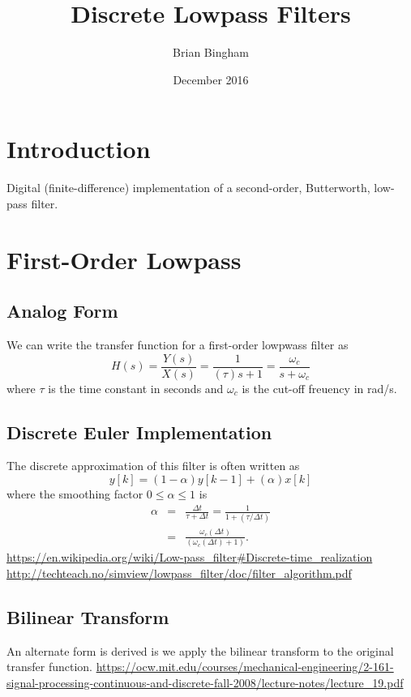 \documentclass[12pt, letterpaper, twoside]{article}
\title{Discrete Lowpass Filters}
\author{Brian Bingham}%
\date{December 2016}
\begin{document}
\maketitle

\section*{Introduction}
Digital (finite-difference) implementation of a second-order, Butterworth, low-pass filter.

\section{First-Order Lowpass}
\subsection{Analog Form}
We can write the transfer function for a first-order lowpwass filter as
\[
H(s) = \frac{Y(s)}{X(s)} = \frac{1}{(\tau)s +1} = \frac{\omega_c}{s+\omega_c}
\]
where $\tau$ is the time constant in seconds and $\omega_c$ is the cut-off freuency in rad/s.
\subsection{Discrete Euler Implementation}
The discrete approximation of this filter is often written as
\[
y[k] = (1-\alpha) y[k-1] + (\alpha) x[k]
\]
where the smoothing factor $0 \leq \alpha \leq 1$ is
\begin{eqnarray*}
\alpha & = & \frac{\Delta t}{\tau + \Delta t} = \frac{1}{1+(\tau / \Delta t)}\\
       & = & \frac{\omega_c (\Delta t)}{(\omega_c (\Delta t)+1)}.
\end{eqnarray*}
\url{https://en.wikipedia.org/wiki/Low-pass_filter#Discrete-time_realization}
\url{http://techteach.no/simview/lowpass_filter/doc/filter_algorithm.pdf}

\subsection{Bilinear Transform}
An alternate form is derived is we apply the bilinear transform to the original transfer function.
\url{https://ocw.mit.edu/courses/mechanical-engineering/2-161-signal-processing-continuous-and-discrete-fall-2008/lecture-notes/lecture_19.pdf}
\end{document}
